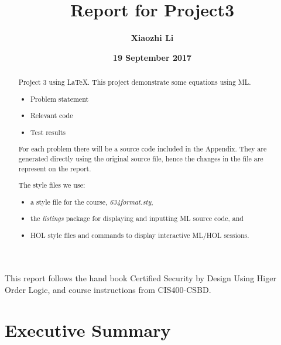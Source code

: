 \documentclass{report}
\title{Report for Project3}
\author{\textbf{Xiaozhi Li}}
\date{\textbf{19 September 2017}}
\begin{document}
\lstset{language=ML}


\maketitle{}

\begin{abstract}
  Project 3 using \LaTeX{}. This project demonstrate some equations using ML.
  \begin{itemize}
  \item Problem statement
  \item Relevant code
  \item Test results
  \end{itemize}

 For each problem there will be a source code included in the Appendix. They are generated directly using the original source file, hence the changes in the file are represent on the report.

The style files we use:
  \begin{itemize}
  \item a style file for the course, \emph{634format.sty},
  \item the \emph{listings} package for displaying and inputting ML
    source code, and
  \item HOL style files and commands to display interactive ML/HOL
    sessions.
  \end{itemize}


 \end{abstract}
\begin{acknowledgments}
 This report follows the hand book Certified Security by Design Using Higer Order Logic, and course instructions from CIS400-CSBD.
\end{acknowledgments}


\tableofcontents{}

\chapter{Executive Summary}
\label{cha:executive-summary-1}
\end{document}

